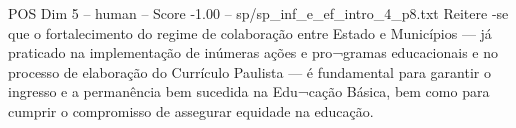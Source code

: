 \begin{textsample}{POS Dim 5 – human – Score -1.00 – sp/sp\_inf\_e\_ef\_intro\_4\_p8.txt}  \label{ex:f5_pos_014}
Reitere -se que o fortalecimento do regime de colaboração entre Estado e Municípios — já praticado na implementação de inúmeras ações e pro¬gramas educacionais e no processo de elaboração do Currículo Paulista — é fundamental para garantir o ingresso e a permanência bem sucedida na Edu¬cação Básica, bem como para cumprir o compromisso de assegurar equidade na educação.

\end{textsample}

